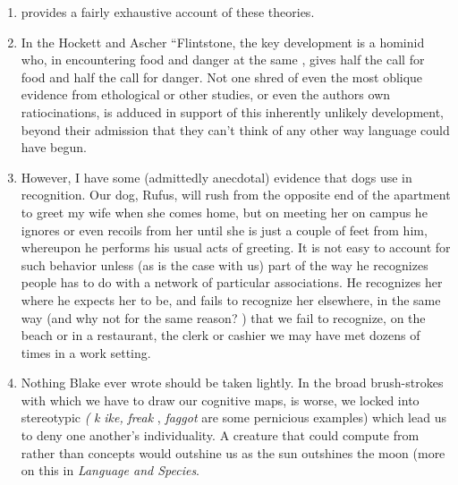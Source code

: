 \begin{enumerate}
 
\item \citet{Hewes1975} provides a fairly exhaustive account of these theories.
\item In the Hockett and Ascher ``Flintstone, the key development 
is a hominid who, in encountering food and danger at the same , gives half the call for food and half the call for danger. Not one shred of even the most oblique evidence from ethological or other studies, or even the authors own ratiocinations, is adduced in support of this inherently unlikely development, beyond their admission that they can't think of any other way language could have begun. 
\item However, I have some (admittedly anecdotal) evidence that 
dogs use  in recognition. Our dog, Rufus, will rush from the opposite end of the apartment to greet my wife when she comes home, but on meeting her on campus he ignores or even recoils from her until she is just a couple of feet from him, whereupon he performs his usual acts of greeting. It is not easy to account for such behavior unless (as is the case with us) part of the way he recognizes people has to do with a network of particular associations. He recog\-nizes her where he expects her to be, and fails to recognize her else\-where, in the same way (and why not for the same reason? ) that we fail to recognize, on the beach or in a restaurant, the clerk or cashier we may have met dozens of times in a work setting. 
\item Nothing Blake ever wrote should be taken lightly. In the 
broad brush-strokes with which we have to draw our cognitive maps, 
is worse, we locked into stereotypic \textit{(} \textit{k} \textit{ike,} \textit{freak} , \textit{faggot} are some pernicious examples) which lead us to deny one another's individuality. A creature that could compute from  rather than concepts would out\-shine us as the sun outshines the moon (more on this in \textit{Language and Species}.
 

\end{enumerate}
